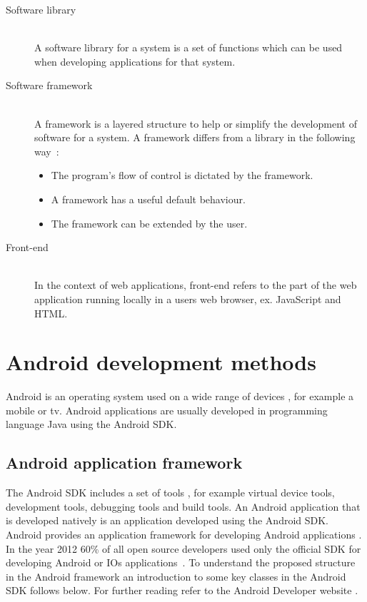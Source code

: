 \begin{description}
\item[Software library] \hfill \\
	A software library for a system is a set of functions which can be used when developing applications for that system.
\item[Software framework] \hfill \\
	A framework is a layered structure to help or simplify the development of software for a system. A framework differs from a library in the following way~\cite{riehle2000}:
\begin{itemize}
\item The program's flow of control is dictated by the framework.
\item A framework has a useful default behaviour.
\item The framework can be extended by the user.
\end{itemize}
\item[Front-end] \hfill \\
	In the context of web applications, front-end refers to the part of the web application running locally in a users web browser, ex. JavaScript and HTML.
\end{description}

\section{Android development methods}\label{sec:android-development-methods}
Android is an operating system used on a wide range of devices \cite{dell2011}, for example a mobile or tv. Android applications are usually developed in programming language Java using the Android SDK.

\subsection{Android application framework} \label{subsec:android-application-framework}
The Android SDK includes a set of tools \cite{sdk2015}, for example virtual device tools, development tools, debugging tools and build tools. An Android application that is developed natively is an application developed using the Android SDK. Android provides an application framework for developing Android applications \cite{android-framework2015}. In the year 2012 60\% of all open source developers used only the official SDK for developing Android or IOs applications~\cite{eclipse2012}. To understand the proposed structure in the Android framework an introduction to some key classes in the Android SDK follows below. For further reading refer to the Android Developer website \cite{androiddevelopers2015}.

